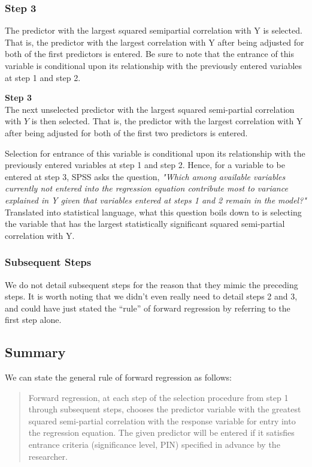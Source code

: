 \documentclass[a4paper,12pt]{article}
\begin{document}
\subsubsection*{Step 3}
The predictor with the largest squared semipartial correlation with Y is selected. That is, the predictor with the largest correlation with Y after being adjusted for both of the first predictors is entered. Be sure to note that the entrance of this variable is conditional upon its relationship with the previously entered variables at step 1 and step 2. 

\textbf{Step 3}\\
The next unselected predictor with the largest squared semi-partial correlation with $Y$ is then selected. That is, the predictor with the largest correlation with Y after being adjusted for both of the first two predictors is entered. 

Selection for entrance of this variable is conditional upon its relationship with the previously entered variables at step 1 and step 2. Hence, for a variable to be entered at step 3, SPSS asks the question, \textit{"Which among available variables currently not entered into the regression equation contribute most to variance explained in Y given that variables entered at steps 1 and 2 remain in the model?"} Translated into statistical language, what this question boils down to is selecting the variable that has the largest statistically significant squared semi-partial correlation with Y.




\subsubsection*{Subsequent Steps} 
We do not detail subsequent steps for the reason that they mimic the preceding steps. It is worth noting that we didn’t even really need to detail steps 2 and 3, and could have just stated the “rule” of forward regression by referring to the first step alone. 

\subsection*{Summary}
We can state the general rule of forward regression as follows:
\begin{quote}
	Forward regression, at each step of the selection procedure from step 1 through subsequent steps, chooses the predictor variable with the greatest squared semi-partial correlation with the response variable for entry into the regression equation. The given predictor will be entered if it satisfies entrance criteria (significance level, PIN) specified in advance by the researcher.
\end{quote}
\end{document}
